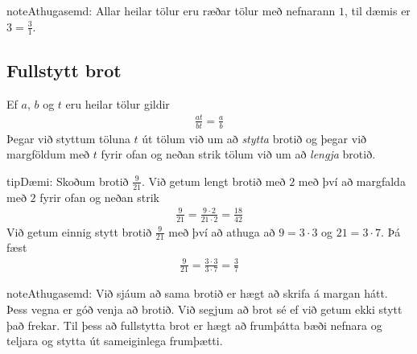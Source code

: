 \documentclass[a4paper,10pt,icelandic]{sphinxmanual}
\begin{document}
\begin{sphinxadmonition}{note}{Athugasemd:}
Allar heilar tölur eru ræðar tölur með nefnarann \(1\), til dæmis er \(3= \frac31\).
\end{sphinxadmonition}


\subsection{Fullstytt brot}
\label{\detokenize{Kafli01:fullstytt-brot}}
Ef \(a\), \(b\) og \(t\) eru heilar tölur gildir
\begin{equation*}
\begin{split}\frac{at}{bt}=\frac{a}{b}\end{split}
\end{equation*}
Þegar við styttum töluna \(t\) út tölum við um að \textit{stytta} brotið og þegar við margföldum með \(t\) fyrir ofan og neðan strik tölum við um að \textit{lengja} brotið.

\begin{sphinxadmonition}{tip}{Dæmi:}
Skoðum brotið \(\frac{9}{21}\). Við getum lengt brotið með \(2\) með því að margfalda með \(2\) fyrir ofan og neðan strik
\begin{equation*}
\begin{split}\frac{9}{21}=\frac{9 \cdot 2}{21 \cdot 2}=\frac{18}{42}\end{split}
\end{equation*}
Við getum einnig stytt brotið \(\frac{9}{21}\) með því að athuga að \(9=3 \cdot 3\) og \(21=3 \cdot 7\). Þá fæst
\begin{equation*}
\begin{split}\frac{9}{21}=\frac{3 \cdot 3}{3 \cdot 7}=\frac{3}{7}\end{split}
\end{equation*}\end{sphinxadmonition}

\begin{sphinxadmonition}{note}{Athugasemd:}
Við sjáum að sama brotið er hægt að skrifa á margan hátt. Þess vegna er góð venja að  brotið. Við segjum að brot sé  ef við getum ekki stytt það frekar. Til þess að fullstytta brot er hægt að frumþátta bæði nefnara og teljara og stytta út sameiginlega frumþætti.
\end{sphinxadmonition}
\end{document}
